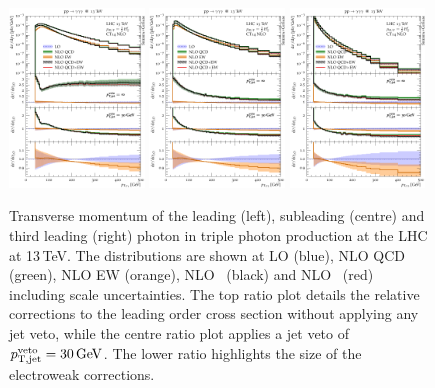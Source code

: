 \begin{figure}[t!]
  \centering
  \includegraphics[width=0.32\textwidth]{figs_aaa/pT_y1}
  \includegraphics[width=0.32\textwidth]{figs_aaa/pT_y2}
  \includegraphics[width=0.32\textwidth]{figs_aaa/pT_y3}
  \caption{
    Transverse momentum of the leading (left), subleading (centre) 
    and third leading (right) photon 
    in triple photon production at the LHC at 13\,TeV. 
    The distributions are shown at LO (blue), NLO QCD (green), 
    NLO EW (orange), NLO \QCDpEW\ (black) and NLO \QCDtEW\ (red) 
    including scale uncertainties. The top ratio plot details 
    the relative corrections to the leading order cross section 
    without applying any jet veto, while the centre ratio plot 
    applies a jet veto of $p_\mathrm{T,jet}^\mathrm{veto}=\text{30\,GeV}$. 
    The lower ratio highlights the size of the electroweak corrections.
    \label{fig:aaa:pt}
  }
\end{figure}

